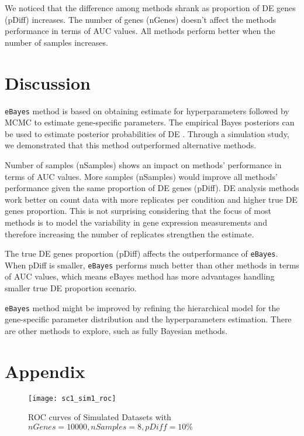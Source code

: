 We noticed that the difference among methods shrank as proportion of DE genes (pDiff) increases. The number of genes (nGenes) doesn't affect the methods performance in terms of AUC values. All methods perform better when the number of samples increases.


\section{Discussion}

{\tt eBayes} method is based on obtaining estimate for hyperparameters followed by MCMC to estimate gene-specific parameters. The empirical Bayes posteriors can be used to estimate posterior probabilities of DE . Through a simulation study, we demonstrated that this method outperformed alternative methods. 

Number of samples (nSamples) shows an impact on methods' performance in terms of AUC values. More samples (nSamples) would improve all methods' performance given the same proportion of DE genes (pDiff). DE analysis methods work better on count data with more replicates per condition and higher true DE genes proportion. This is not surprising considering that the focus of most methods is to model the variability in gene expression measurements and therefore increasing the number of replicates strengthen the estimate. 

The true DE genes proportion (pDiff) affects the outperformance of {\tt eBayes}. When pDiff is smaller, {\tt eBayes} performs much better than other methods in terms of AUC values, which means eBayes method has more advantages handling smaller true DE proportion scenario.

{\tt eBayes} method might be improved by refining the hierarchical model for the gene-specific parameter distribution and the hyperparameters estimation. There are other methods to explore, such as fully Bayesian methods. 



\section{Appendix}

\begin{figure}[h!tb] 
\texttt{[image: sc1\_sim1\_roc]}
\caption{ROC curves of Simulated Datasets with $nGenes=10000, nSamples=8, pDiff=10\%$}
\label{sc1_roc_01}
\end{figure}



